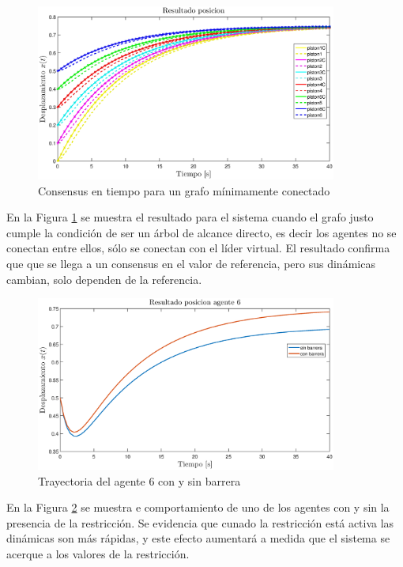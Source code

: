 \begin{figure}[!h]
	\centering
	\includegraphics[width=3.9in]{imagenes/consensus_pos_min.eps}
	\caption{Consensus en tiempo para un grafo mínimamente conectado}
	\label{fig_consensus_pos_min}
\end{figure}
En la Figura \ref{fig_consensus_pos_min} se muestra el resultado para el sistema cuando el grafo justo cumple la condición de ser un árbol de alcance directo, es decir los agentes no se conectan entre ellos, sólo se conectan con el líder virtual. El resultado confirma que que se llega a un consensus en el valor de referencia, pero sus dinámicas cambian, solo dependen de la referencia.

\begin{figure}[!h]
	\centering
	\includegraphics[width=3.9in]{imagenes/efecto_barrera.eps}
	\caption{Trayectoria del agente 6 con y sin barrera}
	\label{fig_efecto_barrera}
\end{figure}
En la Figura \ref{fig_efecto_barrera} se muestra e comportamiento de uno de los agentes con y sin la presencia de la restricción. Se evidencia que cunado la restricción está activa las dinámicas son más rápidas, y este efecto aumentará a medida que el sistema se acerque a los valores de la restricción.
